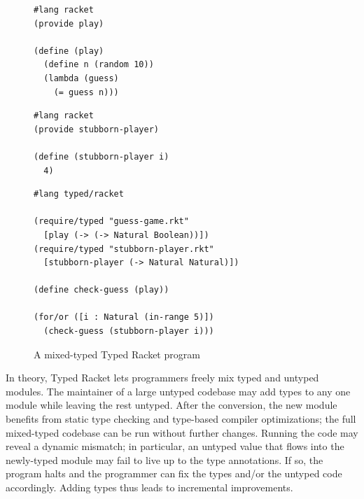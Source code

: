 \begin{figure}[h]
  \begin{minipage}[t]{0.45\columnwidth}
    \begin{lstlisting}
#lang racket
(provide play)

(define (play)
  (define n (random 10))
  (lambda (guess)
    (= guess n)))
    \end{lstlisting}

  \end{minipage}\begin{minipage}[t]{0.45\columnwidth}
    \begin{lstlisting}
#lang racket
(provide stubborn-player)

(define (stubborn-player i)
  4)
    \end{lstlisting}

  \end{minipage}

  \smallskip
  \begin{centering}
    \begin{minipage}{0.6\columnwidth}
      \begin{lstlisting}
#lang typed/racket

(require/typed "guess-game.rkt"
  [play (-> (-> Natural Boolean))])
(require/typed "stubborn-player.rkt"
  [stubborn-player (-> Natural Natural)])

(define check-guess (play))

(for/or ([i : Natural (in-range 5)])
  (check-guess (stubborn-player i)))
      \end{lstlisting}
    \end{minipage}
  \end{centering}

  \caption{A mixed-typed Typed Racket program~\cite{gtnffvf-jfp-2019}}
  \label{fig:guess-game}
\end{figure}

In theory, Typed Racket lets programmers freely mix typed and untyped modules.
The maintainer of a large untyped codebase may add types to any
 one module while leaving the rest untyped.
After the conversion, the new module benefits from static type checking
 and type-based compiler optimizations; the full mixed-typed codebase can
 be run without further changes.
Running the code may reveal a dynamic mismatch; in particular, an untyped value
 that flows into the newly-typed module may fail to live up to the type annotations.
If so, the program halts and the programmer can fix the types
 and/or the untyped code accordingly.
Adding types thus leads to incremental improvements.

